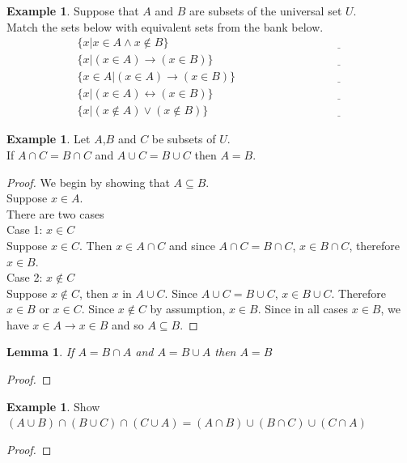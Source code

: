 \documentclass[letterpaper,10pt]{article}
\theoremstyle{plain}
\newtheorem{lem}[thm]{Lemma}
\theoremstyle{definition}
\newtheorem{exmp}[thm]{Example}
\theoremstyle{remark}
\providecommand{\land}{\ensuremath{\wedge}}
\providecommand{\lor}{\ensuremath{\vee}}
\begin{document}
\begin{exmp}
Suppose that $A$ and $B$ are subsets of the universal set $U$. 
\\
Match the sets below with equivalent sets from the bank below.
\begin{align}
&\{x| x\in A \land x \notin B\} \hspace{3cm}&\underline{\hspace{1cm}
}\\
&\{x| (x\in A) \to (x \in B)\} \hspace{3cm}&\underline{\hspace{1cm}
}\\
&\{x\in A| (x\in A) \to (x \in B)\} \hspace{3cm}&\underline{\hspace{1cm}
}\\
&\{x| (x\in A) \leftrightarrow (x \in B)\} \hspace{3cm}&\underline{\hspace{1cm}
}\\
&\{x| (x\notin A) \lor (x \notin B)\} \hspace{3cm}&\underline{\hspace{1cm}
}
\end{align}
\end{exmp}
\begin{exmp}
Let $A$,$B$ and $C$ be subsets of $U$.\\
If $A\cap C=B\cap C$ and $A\cup C =B\cup C$ then $A=B$.
\end{exmp}
\begin{proof}
We begin by showing that $A\subseteq B$.\\
Suppose $x\in A$.\\
There are two cases\\
Case 1: $x\in C$\\
Suppose $x \in C$. Then $x\in A\cap C$ and since $A\cap C=B\cap C$, $x\in B\cap C$, therefore $x \in B$.\\
Case 2: $x\notin C$\\
Suppose $x\notin C$, 
then $x$ in $A\cup C$. 
Since $A\cup C=B\cup C$, 
$x\in B\cup C$. 
Therefore $x\in B$ or $x \in C$.
Since $x \notin C$ by assumption, $x\in B$.
Since in all cases $x \in B$, we have $x \in A \to x \in B$ and so $A \subseteq B$.
\end{proof}

\begin{lem}
If $A=B\cap A$ and $A =B\cup A$ then $A=B$
\end{lem}
\begin{proof}
\vspace{5cm}
\end{proof}
\begin{exmp}
Show $(A\cup B)\cap (B\cup C)\cap (C\cup A) =(A\cap B)\cup (B\cap C)\cup (C\cap A)$
\end{exmp}
\begin{proof}

\end{proof}
\end{document}
